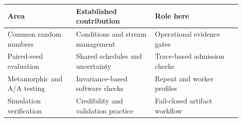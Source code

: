 \begin{tabular}{p{0.27\linewidth}p{0.31\linewidth}p{0.34\linewidth}}
\toprule
Area & Established contribution & Role here \\
\midrule
Common random numbers & Conditions and stream management & Operational evidence gates \\
Paired-seed evaluation & Shared schedules and uncertainty & Trace-based admission checks \\
Metamorphic and A/A testing & Invariance-based software checks & Repeat and worker profiles \\
Simulation verification & Credibility and validation practice & Fail-closed artifact workflow \\
\bottomrule
\end{tabular}

